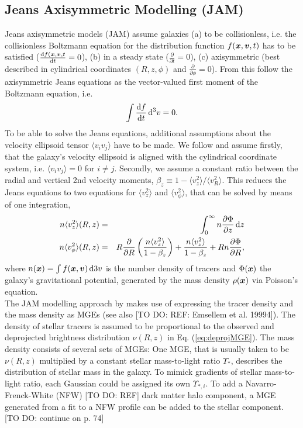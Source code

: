 \subsection{Jeans Axisymmetric Modelling (JAM)}

Jeans axisymmetric models (JAM) assume galaxies (a) to be collisionless, i.e. the collisionless Boltzmann equation for the distribution function $f(\boldsymbol{x},\boldsymbol{v},t)$ has to be satisfied ($\frac{\mathop{}\!\mathrm{d} f(\boldsymbol{x},\boldsymbol{v},t}{\mathop{}\!\mathrm{d} t} = 0$), (b) in a steady state ($\frac{\partial}{\partial t} = 0$), (c) axisymmetric (best described in cylindrical coordinates $(R,z,\phi)$ and $\frac{\partial}{\partial \phi} = 0$). From this follow the axisymmetric Jeans equations as the vector-valued first moment of the Boltzmann equation, i.e.
\begin{equation*}
\int \frac{\mathop{}\!\mathrm{d} f}{\mathop{}\!\mathrm{d} t} \mathop{}\!\mathrm{d^3} v = 0.
\end{equation*}
To be able to solve the Jeans equations, additional assumptions about the velocity ellipsoid tensor $\langle v_i v_j\rangle$ have to be made. We follow \citet{Cap08} and assume firstly, that the galaxy's velocity ellipsoid is aligned with the cylindrical coordinate system, i.e. $\langle v_i v_j\rangle = 0$ for $i\neq j$. Secondly, we assume a constant ratio between the radial and vertical 2nd velocity moments, $\beta_z \equiv 1 - \langle v_z^2 \rangle / \langle v_R^2\rangle$. This reduces the Jeans equations to two equations for $\langle v_z^2 \rangle$ and $\langle v_\phi^2 \rangle$, that can be solved by means of one integration,
\begin{eqnarray*}
n \langle v_z^2 \rangle (R,z) &=& \int_0^\infty n \frac{\partial \Phi}{\partial z} \mathop{}\!\mathrm{d} z\\
n \langle v_\phi^2 \rangle (R,z) &=& R \frac{\partial}{\partial R} \left( \frac{n \langle v_z^2 \rangle}{1-\beta_z} \right) + \frac{n \langle v_z^2 \rangle}{1 - \beta_z} + R n \frac{\partial \Phi}{\partial R},
\end{eqnarray*}
where $n(\boldsymbol{x}) = \int f(\boldsymbol{x},\boldsymbol{v}) \mathop{}\!\mathrm{d}3 v$ is the number density of tracers and $\Phi(\boldsymbol{x})$ the galaxy's gravitational potential, generated by the mass density $\rho(\boldsymbol{x})$ via Poisson's equation.
\\The JAM modelling approach by \citet{Cap08} makes use of expressing the tracer density and the mass density as MGEs (see also [TO DO: REF: Emsellem et al. 19994]). The density of stellar tracers is assumed to be proportional to the observed and deprojected brightness distribution $\nu(R,z)$ in Eq. (\ref{eq:deprojMGE}). The mass density consists of several sets of MGEs: One MGE, that is usually taken to be $\nu(R,z)$ multiplied by a constant stellar mass-to-light ratio $\Upsilon_*$, describes the distribution of stellar mass in the galaxy. To mimick gradients of stellar mass-to-light ratio, each Gaussian could be assigned its own $\Upsilon_{*,i}$. To add a Navarro-Frenck-White (NFW) [TO DO: REF] dark matter halo component, a MGE generated from a fit to a NFW profile can be added to the stellar component. [TO DO: continue on p. 74] 


